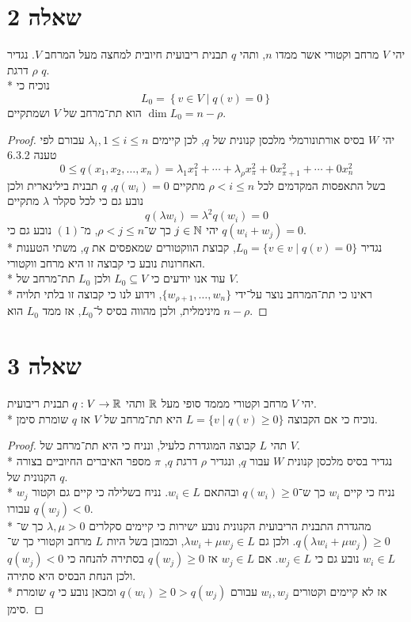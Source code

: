 \section{שאלה 2}
יהי $V$ מרחב וקטורי אשר ממדו $n$, ותהי $q$ תבנית ריבועית חיובית למחצה מעל המרחב $V$. נגדיר $\rho$ דרגת $q$.\\*
נוכיח כי
\[
	L_0 = \left\{ v \in V \mid q(v) = 0 \right\}
\]
הוא תת־מרחב של $V$ ושמתקיים $\dim L_0 = n - \rho$.
\begin{proof}
	יהי $W$ בסיס אורתונורמלי מלכסן קנונית של $q$, לכן קיימים $\lambda_i, 1 \le i \le n$ עבורם לפי טענה 6.3.2
	\[
		0 \le q(x_1, x_2, \hdots, x_n) = \lambda_1 x_1^2 + \cdots + \lambda_{\rho} x_{\pi}^2 + 0 x_{\pi + 1}^2 + \cdots + 0 x_n^2 \tag{1}
	\]
	בשל התאפסות המקדמים לכל $\rho < i \le n$ מתקיים $q(w_i) = 0$, $q$ תבנית בילינארית ולכן נובע גם כי לכל סקלר $\lambda$ מתקיים
	\[
		q(\lambda w_i) = \lambda^2 q(w_i) = 0
	\]
	יהי $j \in \mathbb{N}$ כך ש־$\rho < j \le n$, מ־$(1)$ נובע גם כי $q(w_i + w_j) = 0$. \\*
	נגדיר $L_0 = \{ v \in v \mid q(v) = 0 \}$, קבוצת הווקטורים שמאפסים את $q$, משתי הטענות האחרונות נובע כי קבוצה זו היא מרחב ווקטורי. \\*
	עוד אנו יודעים כי $L_0 \subseteq V$ ולכן $L_0$ תת־מרחב של $V$. \\*
	ראינו כי תת־המרחב נוצר על־ידי $\{ w_{\rho + 1}, \hdots, w_n \}$, וידוע לנו כי קבוצה זו בלתי תלויה מינימלית, ולכן מהווה בסיס ל־$L_0$,
	אז ממד $L_0$ הוא $n - \rho$.
\end{proof}

\section{שאלה 3}
יהי $V$ מרחב וקטורי מממד סופי מעל $\mathbb{R}$ ותהי $q : V \to \mathbb{R}$ תבנית ריבועית. \\*
נוכיח כי אם הקבוצה $L = \{ v \mid q(v) \ge 0 \}$ היא תת־מרחב של $V$ אז $q$ שומרת סימן.
\begin{proof}
	תהי $L$ קבוצה המוגדרת כלעיל, ונניח כי היא תת־מרחב של $V$. \\*
	נגדיר בסיס מלכסן קנונית $W$ עבור $q$, ונגדיר $\rho$ דרגת $q$, $\pi$ מספר האיברים החיוביים בצורה הקנונית של $q$. \\*
	נניח כי קיים $w_i$ כך ש־$q(w_i) \ge 0$ ובהתאם $w_i \in L$.
	נניח בשלילה כי קיים גם וקטור $w_j$ עבורו $q(w_j) < 0$. \\*
	מהגדרת התבנית הריבועית הקנונית נובע ישירות כי קיימים סקלרים $\lambda, \mu > 0$ כך ש־$q(\lambda w_i + \mu w_j) \ge 0$.
	ולכן גם $\lambda w_i + \mu w_j \in L$, וכמובן בשל היות $L$ מרחב וקטורי כך ש־$w_i \in L$ נובע גם כי $w_j \in L$.
	אם $w_j \in L$ אז $q(w_j) \ge 0$ בסתירה להנחה כי $q(w_j) < 0$ ולכן הנחת הבסיס היא סתירה. \\*
	אז לא קיימים וקטורים $w_i, w_j$ עבורם $q(w_i) \ge 0 > q(w_j)$ ומכאן נובע כי $q$ שומרת סימן.
\end{proof}

